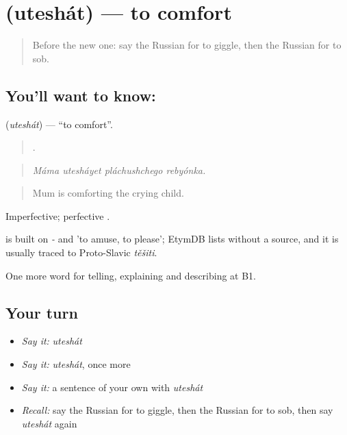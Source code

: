 \section[\texorpdfstring{\ru{утешать} (uteshát)}{утешать (uteshát)}]{ (uteshát) — to comfort}

\label{lesson:RU-C480-uteshat}



\begin{quote}
Before the new one: say the Russian for to giggle, then the Russian for to sob.
\end{quote}

\subsection*{You'll want to know: }
\textbf{} (\emph{uteshát}) — \textquotedblleft{}to comfort\textquotedblright{}.

\begin{quote}
   .
\end{quote}

\begin{quote}
\emph{Máma utesháyet pláchushchego rebyónka.}
\end{quote}

\begin{quote}
Mum is comforting the crying child.
\end{quote}

Imperfective; perfective .

\begin{cousinweb}
\emph{} is built on \emph{-} and \emph{} 'to amuse, to please'; EtymDB lists \emph{} without a source, and it is usually traced to Proto-Slavic \emph{těšiti}.
\end{cousinweb}

\begin{grammarlens}[title={What you've built}]
One more word for telling, explaining and describing at B1.
\end{grammarlens}

\subsection*{Your turn}
\begin{itemize}
\raggedright
  \item \emph{Say it:} \emph{uteshát}
  \item \emph{Say it:} \emph{uteshát}, once more
  \item \emph{Say it:} a sentence of your own with \emph{uteshát}
  \item \emph{Recall:} say the Russian for to giggle, then the Russian for to sob, then say \emph{uteshát} again
\end{itemize}

